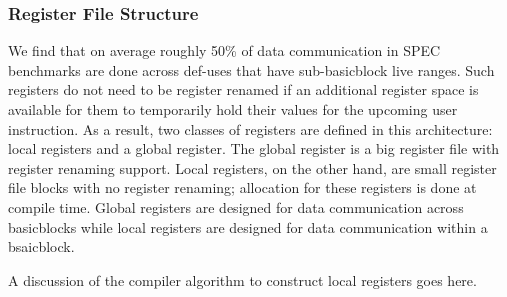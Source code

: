 \subsubsection{Register File Structure}
\label{sec:reg_files}

We find that on average roughly 50\% of data communication in SPEC benchmarks
are done across def-uses that have sub-basicblock live ranges. Such registers
do not need to be register renamed if an additional register space is available
for them to temporarily hold their values for the upcoming user instruction.  As
a result, two classes of registers are defined in this architecture: local registers
and a global register. The global register is a big register file with register
renaming support. Local registers, on the other hand, are small register
file blocks with no register renaming; allocation for these registers is
done at compile time.  Global registers are designed for data communication
across basicblocks while local registers are designed for data communication
within a bsaicblock.

A discussion of the compiler algorithm to construct local registers goes here.
